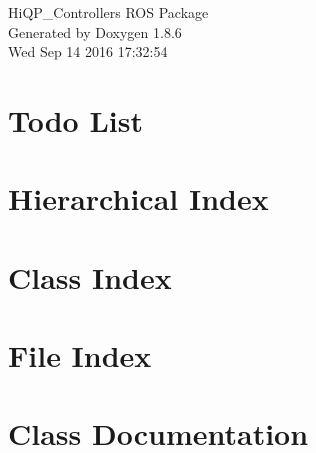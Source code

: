 \documentclass[twoside]{book}
\newcommand{\clearemptydoublepage}{%
  \newpage{\pagestyle{empty}\cleardoublepage}%
}
\begin{document}
\hypersetup{pageanchor=false}
\begin{titlepage}
\vspace*{7cm}
\begin{center}%
{\Large Hi\-Q\-P\-\_\-\-Controllers R\-O\-S Package }\\
\vspace*{1cm}
{\large Generated by Doxygen 1.8.6}\\
\vspace*{0.5cm}
{\small Wed Sep 14 2016 17:32:54}\\
\end{center}
\end{titlepage}
\clearemptydoublepage
\tableofcontents
\clearemptydoublepage
{}
\hypersetup{pageanchor=true}

\chapter{Todo List}
\label{todo}
\hypertarget{todo}{}

\chapter{Hierarchical Index}

\chapter{Class Index}

\chapter{File Index}

\chapter{Class Documentation}






























\end{document}

